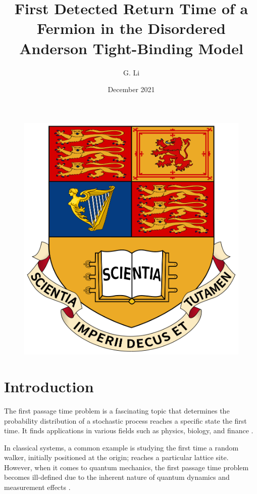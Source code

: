 \documentclass[12pt]{article}
\title{First Detected Return Time of a Fermion in the Disordered Anderson Tight-Binding Model}
\author{G. Li}
\date{December 2021}
\numberwithin{equation}{section}
\newcommand{\1}{\mathbb{1}}
\begin{document}
\begin{figure}
    \centering
    \includegraphics[scale=0.2]{Logo.png}
\end{figure}
\maketitle
\newpage
\tableofcontents
\newpage



\section{Introduction}
The first passage time problem is a fascinating topic that determines the probability distribution of a stochastic process reaches a specific state the first time. It finds applications in various fields such as physics, biology, and finance \cite{redner_first-passage_2001}.

In classical systems, a common example is studying the first time a random walker, initially positioned at the origin; reaches a particular lattice site. However, when it comes to quantum mechanics, the first passage time problem becomes ill-defined due to the inherent nature of quantum dynamics and measurement effects \cite{quantum_griffiths}.
\end{document}
